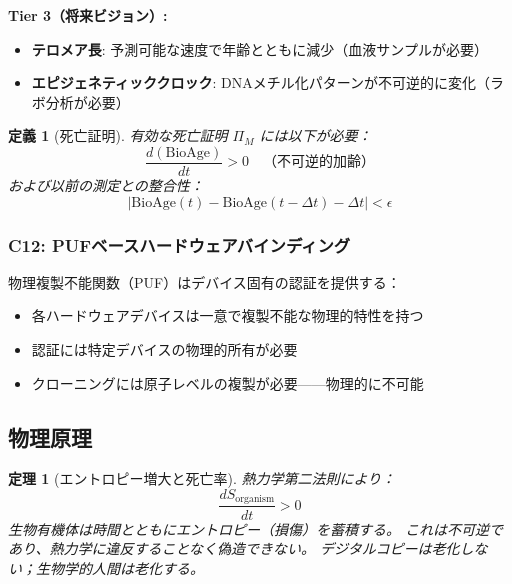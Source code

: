 \documentclass[11pt,a4paper]{article}
\newtheorem{theorem}{定理}
\newtheorem{definition}{定義}
\begin{document}
\textbf{Tier 3（将来ビジョン）:}
\begin{itemize}
    \item \textbf{テロメア長}: 予測可能な速度で年齢とともに減少（血液サンプルが必要）
    \item \textbf{エピジェネティッククロック}: DNAメチル化パターンが不可逆的に変化（ラボ分析が必要）
\end{itemize}

\begin{definition}[死亡証明]
有効な死亡証明 $\Pi_M$ には以下が必要：
\begin{equation}
\frac{d(\text{BioAge})}{dt} > 0 \quad \text{（不可逆的加齢）}
\end{equation}
および以前の測定との整合性：
\begin{equation}
|\text{BioAge}(t) - \text{BioAge}(t-\Delta t) - \Delta t| < \epsilon
\end{equation}
\end{definition}

\subsubsection{C12: PUFベースハードウェアバインディング}

物理複製不能関数（PUF）はデバイス固有の認証を提供する：
\begin{itemize}
    \item 各ハードウェアデバイスは一意で複製不能な物理的特性を持つ
    \item 認証には特定デバイスの物理的所有が必要
    \item クローニングには原子レベルの複製が必要——物理的に不可能
\end{itemize}

\subsection{物理原理}

\begin{theorem}[エントロピー増大と死亡率]
熱力学第二法則により：
\begin{equation}
\frac{dS_{\text{organism}}}{dt} > 0
\end{equation}
生物有機体は時間とともにエントロピー（損傷）を蓄積する。
これは不可逆であり、熱力学に違反することなく偽造できない。
デジタルコピーは老化しない；生物学的人間は老化する。
\end{theorem}

\end{document}
